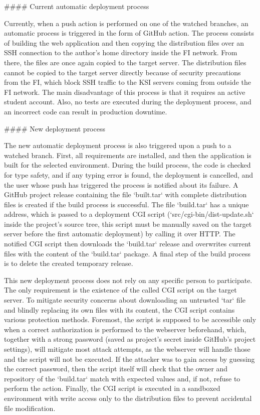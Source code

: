 \documentclass[
  digital, %
  oneside, %
  lof,     %
  nolot,     %
]{fithesis4}
\begin{document}
{#### Current automatic deployment process

Currently, when a push action is performed on one of the watched branches, an automatic process is triggered in the form of GitHub action. The process consists of building the web application and then copying the distribution files over an \acrshort{SSH} connection to the author's home directory inside the \acrshort{FI} network. From there, the files are once again copied to the target server. The distribution files cannot be copied to the target server directly because of security precautions from the \acrshort{FI}, which block \acrshort{SSH} traffic to the \acrshort{KSI} servers coming from outside the \acrshort{FI} network. The main disadvantage of this process is that it requires an active student account. Also, no tests are executed during the deployment process, and an incorrect code can result in production downtime.

#### New deployment process

The new automatic deployment process is also triggered upon a push to a watched branch. First, all requirements are installed, and then the application is built for the selected environment. During the build process, the code is checked for type safety, and if any typing error is found, the deployment is cancelled, and the user whose push has triggered the process is notified about its failure. A GitHub project release containing the file `built.tar` with complete distribution files is created if the build process is successful. The file `build.tar` has a unique address, which is passed to a deployment \acrshort{CGI} script (`src/cgi-bin/dist-update.sh` inside the project's source tree, this script must be manually saved on the target server before the first automatic deployment) by calling it over \acrshort{HTTP}. The notified \acrshort{CGI} script then downloads the `build.tar` release and overwrites current files with the content of the `build.tar` package. A final step of the build process is to delete the created temporary release.

This new deployment process does not rely on any specific person to participate. The only requirement is the existence of the called \acrshort{CGI} script on the target server. To mitigate security concerns about downloading an untrusted `tar` file and blindly replacing its own files with its content, the \acrshort{CGI} script contains various protection methods. Foremost, the script is supposed to be accessible only when a correct authorization is performed to the webserver beforehand, which, together with a strong password (saved as project's secret inside GitHub's project settings), will mitigate most attack attempts, as the webserver will handle those and the script will not be executed. If the attacker was to gain access by guessing the correct password, then the script itself will check that the owner and repository of the `build.tar` match with expected values and, if not, refuse to perform the action. Finally, the \acrshort{CGI} script is executed in a sandboxed environment with write access only to the distribution files to prevent accidental file modification.

}
\end{document}
